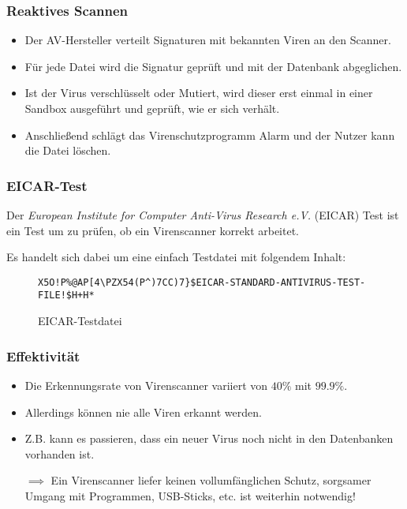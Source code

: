			\subsubsection{Reaktives Scannen}
				\begin{itemize}
					\item Der AV-Hersteller verteilt Signaturen mit bekannten Viren an den Scanner.
					\item Für jede Datei wird die Signatur geprüft und mit der Datenbank abgeglichen.
					\item Ist der Virus verschlüsselt oder Mutiert, wird dieser erst einmal in einer Sandbox ausgeführt und geprüft, wie er sich verhält.
					\item Anschließend schlägt das Virenschutzprogramm Alarm und der Nutzer kann die Datei löschen.
				\end{itemize}

			\subsubsection{EICAR-Test}
				Der \textit{European Institute for Computer Anti-Virus Research e.V.} (EICAR) Test ist ein Test um zu prüfen, ob ein Virenscanner korrekt arbeitet.

				Es handelt sich dabei um eine einfach Testdatei mit folgendem Inhalt:
				\begin{figure}[H]
					\centering
					\texttt{X5O!P\%@AP[4\textbackslash{}PZX54(P\^{})7CC)7\}\$EICAR-STANDARD-ANTIVIRUS-TEST-FILE!\$H+H*}
					\caption{EICAR-Testdatei}
				\end{figure}

			\subsubsection{Effektivität}
				\begin{itemize}
					\item Die Erkennungsrate von Virenscanner variiert von \(40\%\) mit \(99.9\%\).
					\item Allerdings können nie alle Viren erkannt werden.
					\item Z.B. kann es passieren, dass ein neuer Virus noch nicht in den Datenbanken vorhanden ist.
					\item[\(\implies\)] Ein Virenscanner liefer keinen vollumfänglichen Schutz, sorgsamer Umgang mit Programmen, USB-Sticks, etc. ist weiterhin notwendig!
				\end{itemize}

